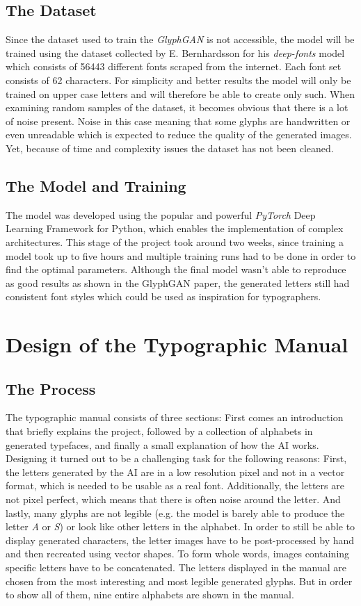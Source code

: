 \documentclass[11pt]{article}
\begin{document}
\subsection{The Dataset}
Since the dataset used to train the \emph{GlyphGAN} is not accessible, the model will be trained using the dataset collected by E. Bernhardsson for his \emph{deep-fonts} model which consists of 56443 different fonts scraped from the internet. Each font set consists of 62 characters. For simplicity and better results the model will only be trained on upper case letters and will therefore be able to create only such. When examining random samples of the dataset, it becomes obvious that there is a lot of noise present. Noise in this case meaning that some glyphs are handwritten or even unreadable which is expected to reduce the quality of the generated images. Yet, because of time and complexity issues the dataset has not been cleaned.

\subsection{The Model and Training}
The model was developed using the popular and powerful \emph{PyTorch} \cite{paszke2019pytorch} Deep Learning Framework for Python, which enables the implementation of complex architectures.
This stage of the project took around two weeks, since training a model took up to five hours and multiple training runs had to be done in order to find the optimal parameters. Although the final model wasn't able to reproduce as good results as shown in the GlyphGAN paper, the generated letters still had consistent font styles which could be used as inspiration for typographers.

\section{Design of the Typographic Manual}
\subsection{The Process}
The typographic manual consists of three sections: First comes an introduction that briefly explains the project, followed by a collection of alphabets in generated typefaces, and finally a small explanation of how the AI works.
Designing it turned out to be a challenging task for the following reasons: First, the letters generated by the AI are in a low resolution pixel and not in a vector format, which is needed to be usable as a real font. Additionally, the letters are not pixel perfect, which means that there is often noise around the letter. And lastly, many glyphs are not legible (e.g. the model is barely able to produce the letter \emph{A} or \emph{S}) or look like other letters in the alphabet.
In order to still be able to display generated characters, the letter images have to be post-processed by hand and then recreated using vector shapes. To form whole words, images containing specific letters have to be concatenated. The letters displayed in the manual are chosen from the most interesting and most legible generated glyphs. But in order to show all of them, nine entire alphabets are shown in the manual.
\end{document}
